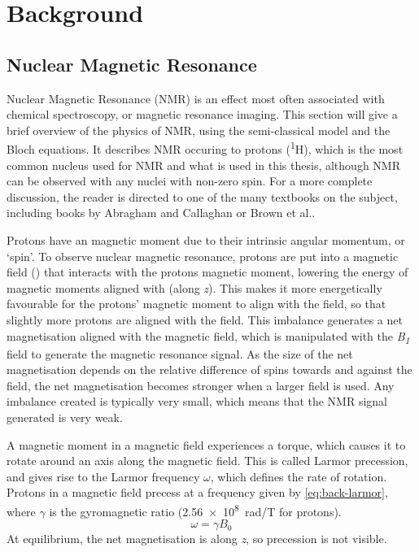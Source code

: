 \chapter{Background}\label{ch:background}

\section{Nuclear Magnetic Resonance}

Nuclear Magnetic Resonance (NMR) is an effect most often associated with chemical spectroscopy, or magnetic resonance imaging.
This section will give a brief overview of the physics of NMR, using the semi-classical model and the Bloch equations.
It describes NMR occuring to protons (\textsuperscript{1}H), which is the most common nucleus used for NMR and what is used in this thesis, although NMR can be observed with any nuclei with non-zero spin.
For a more complete discussion, the reader is directed to one of the many textbooks on the subject, including books by Abragham\cite{AbragamPrinciplesNuclearMagnetism1961} and Callaghan\cite{CallaghanPrinciplesNuclearMagnetic1994} or Brown et al.\cite{BrownMagneticResonanceImaging2014a}.

Protons have an magnetic moment due to their intrinsic angular momentum, or `spin'.
To observe nuclear magnetic resonance, protons are put into a magnetic field (\Bzero) that interacts with the protons magnetic moment, lowering the energy of magnetic moments aligned with \Bzero (along \textit{z}).
This makes it more energetically favourable for the protons' magnetic moment to align with the field, so that slightly more protons are aligned with the field.
This imbalance generates a net magnetisation aligned with the magnetic field, which is manipulated with the \textit{B\textsubscript{1}} field to generate the magnetic resonance signal.
As the size of the net magnetisation depends on the relative difference of spins towards and against the field, the net magnetisation becomes stronger when a larger \Bzero field is used.
Any imbalance created is typically very small, which means that the NMR signal generated is very weak.

A magnetic moment in a magnetic field experiences a torque, which causes it to rotate around an axis along the magnetic field.
This is called Larmor precession, and gives rise to the Larmor frequency $\omega$, which defines the rate of rotation.
Protons in a magnetic field precess at a frequency given by \autoref{eq:back-larmor}, where $\gamma$ is the gyromagnetic ratio (\SI{2.56e8}{rad/T} for protons).
\begin{equation}
\omega = \gamma B_0
\label{eq:back-larmor}
\end{equation}
At equilibrium, the net magnetisation is along \textit{z}, so precession is not visible.

